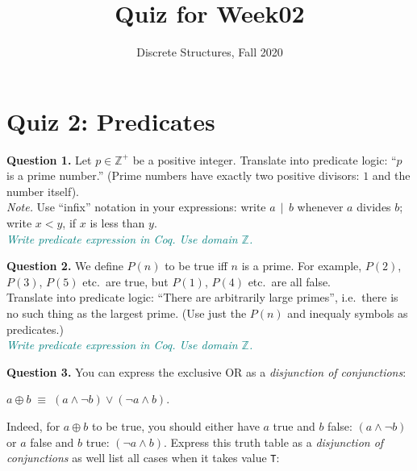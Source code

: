 \documentclass[jou]{apa6}
\title{Quiz for Week02}
\author{Discrete Structures, Fall 2020}
\affiliation{RBS}
\begin{document}

\twocolumn

\section{Quiz 2: Predicates}


\vspace{6pt}
{\bf Question 1.} Let $p \in \mathbb{Z}^{+}$ be a positive integer.
Translate into predicate logic: ``$p$ is a prime number.'' (Prime numbers
have exactly two positive divisors: $1$ and the number itself).\\
{\em Note.} Use ``infix'' notation in your expressions: write 
$a\,\mid\,b$ whenever $a$ divides $b$; write $x < y$, if $x$ is less than $y$.\\
\textcolor{teal}{\em Write predicate expression in Coq. Use domain $\mathbb{Z}$.}



\vspace{10pt}
{\bf Question 2.} We define $P(n)$ to be true
iff $n$ is a prime. For example, 
$P(2)$, $P(3)$, $P(5)$ etc.\ are true,
but $P(1)$, $P(4)$ etc.\ are all false.\\
Translate into predicate logic: ``There are arbitrarily large primes'', i.e.\ there is no 
such thing as the largest prime.
(Use just the $P(n)$ and inequaly symbols as predicates.)\\
\textcolor{teal}{\em Write predicate expression in Coq. Use domain $\mathbb{Z}$.}

\vspace{10pt}
{\bf Question 3.} You can express the exclusive OR as a {\em disjunction of conjunctions}:
\begin{center}
$a \oplus b \;\equiv\; (a \wedge \neg b) \vee (\neg a \wedge b)$.
\end{center}
Indeed, for $a \oplus b$ to be true, you should 
either have $a$ true and $b$ false: $(a \wedge \neg b)$ or 
$a$ false and $b$ true: $(\neg a \wedge b)$. 
Express this truth table as a {\em disjunction of conjunctions} as well \textendash{}
list all cases when it takes value {\tt T}:
\end{document}
